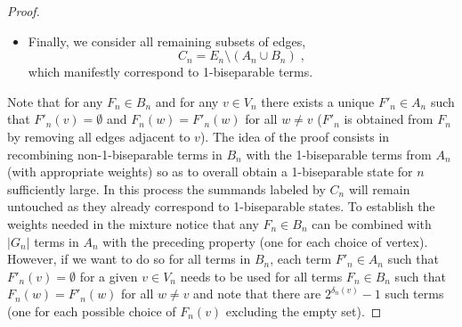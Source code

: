 \documentclass[10pt,a4paper]{amsart}
\begin{document}
\begin{proof}
\begin{itemize}
\item Finally, we consider all remaining subsets of edges,
\begin{equation}\label{cn}
C_n= E_n\setminus \left(A_n\cup B_n\right)\;,
\end{equation}
which manifestly correspond to 1-biseparable terms.
\end{itemize}

Note that for any $F_n\in B_n$ and for any $v\in V_n$ there exists a
unique $F'_n\in A_n$ such that $F'_n(v)=\emptyset$ and $F_n(w)=F'_n(w)$ for all $w\neq v$ ($F'_n$ is obtained from $F_n$ by removing all edges adjacent to $v$).
The idea of the proof consists in recombining non-1-biseparable terms in $B_n$
with the 1-biseparable terms from $A_n$ (with appropriate weights) so
as to overall obtain a 1-biseparable state for $n$ sufficiently large. In this
process the summands labeled by $C_n$ will remain untouched as they already correspond to
1-biseparable states.
To establish the weights needed in the mixture notice that any $F_n\in B_n$ can be
combined with $|G_n|$ terms in $A_n$ with the preceding property (one for each choice of vertex). However, if we want to do so
for all terms in $B_n$, each term $F'_n\in A_n$ such that $F'_n(v)=\emptyset$
for a given $v\in V_n$ needs to be used for all terms $F_n\in B_n$ such that
$F_n(w)=F'_n(w)$ for all $w\neq v$ and note that there are $2^{\delta_n(v)}-1$
such terms (one for each possible choice of $F_n(v)$ excluding the empty
set).


\end{proof}
\end{document}
